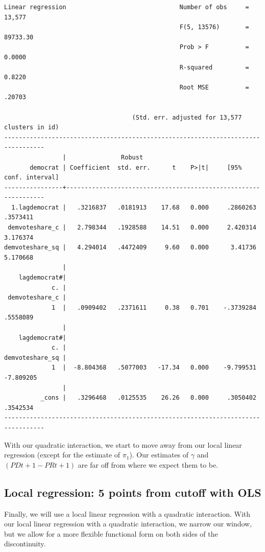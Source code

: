 \documentclass[
]{book}
\begin{document}
\begin{verbatim}
Linear regression                               Number of obs     =     13,577
                                                F(5, 13576)       =   89733.30
                                                Prob > F          =     0.0000
                                                R-squared         =     0.8220
                                                Root MSE          =     .20703

                                   (Std. err. adjusted for 13,577 clusters in id)
---------------------------------------------------------------------------------
                |               Robust
       democrat | Coefficient  std. err.      t    P>|t|     [95% conf. interval]
----------------+----------------------------------------------------------------
  1.lagdemocrat |   .3216837   .0181913    17.68   0.000     .2860263    .3573411
 demvoteshare_c |   2.798344   .1928588    14.51   0.000     2.420314    3.176374
demvoteshare_sq |   4.294014   .4472409     9.60   0.000      3.41736    5.170668
                |
    lagdemocrat#|
             c. |
 demvoteshare_c |
             1  |   .0909402   .2371611     0.38   0.701    -.3739284    .5558089
                |
    lagdemocrat#|
             c. |
demvoteshare_sq |
             1  |  -8.804368   .5077003   -17.34   0.000    -9.799531   -7.809205
                |
          _cons |   .3296468   .0125535    26.26   0.000     .3050402    .3542534
---------------------------------------------------------------------------------
\end{verbatim}

With our quadratic interaction, we start to move away from our local linear regression (except for the estimate of \(\pi_1\)). Our estimates of \(\gamma\) and \((PDt+1 - PRt+1)\) are far off from where we expect them to be.

\subsection{Local regression: 5 points from cutoff with OLS}\label{local-regression-5-points-from-cutoff-with-ols}

Finally, we will use a local linear regression with a quadratic interaction. With our local linear regression with a quadratic interaction, we narrow our window, but we allow for a more flexible functional form on both sides of the discontinuity.
\end{document}
